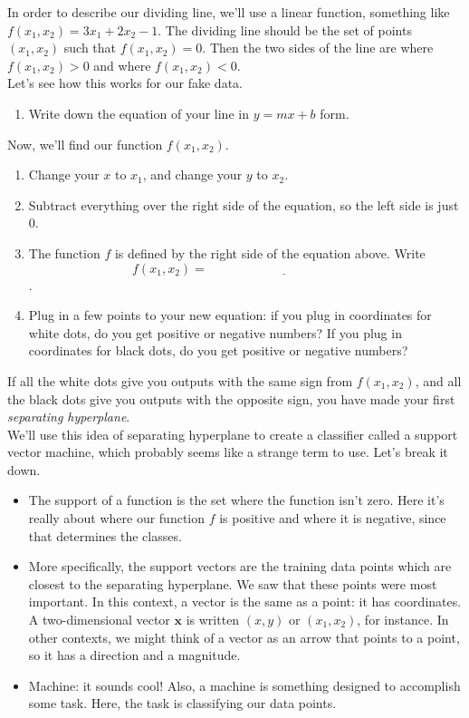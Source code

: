 \documentclass[10pt]{article}
\renewcommand{\vec}[1]{\mathbf{#1}}
\begin{document}
\newpage

In order to describe our dividing line, we'll use a linear function, something like $f(x_1,x_2) = 3x_1+2x_2-1$. The dividing line should be the set of points $(x_1,x_2)$ such that $f(x_1,x_2)=0$. Then the two sides of the line are where $f(x_1,x_2) >0$ and where $f(x_1,x_2) < 0$.\\

Let's see how this works for our fake data.

\begin{enumerate}[resume]
\item Write down the equation of your line in $y=mx+b$ form.
\vfill
\end{enumerate}

Now, we'll find our function $f(x_1,x_2)$.

\begin{enumerate}[resume]
\item Change your $x$ to $x_1$, and change your $y$ to $x_2$.
\vfill
\item Subtract everything over the right side of the equation, so the left side is just $0$.
\vfill
\item The function $f$ is defined by the right side of the equation above. Write 
\[f(x_1,x_2 ) = \underline{\hspace{2in}}\].
\item Plug in a few points to your new equation: if you plug in coordinates for white dots, do you get positive or negative numbers? If you plug in coordinates for black dots, do you get positive or negative numbers?
\vfill
\end{enumerate}

If all the white dots give you outputs with the same sign from $f(x_1,x_2)$, and all the black dots give you outputs with the opposite sign, you have made your first \textit{separating hyperplane}.\\

We'll use this idea of separating hyperplane to create a classifier called a support vector machine, which probably seems like a strange term to use. Let's break it down. 
\begin{itemize}
\item The support of a function is the set where the function isn't zero. Here it's really about where our function $f$ is positive and where it is negative, since that determines the classes.
\item More specifically, the support vectors are the training data points which are closest to the separating hyperplane. We saw that these points were most important. In this context, a vector is the same as a point: it has coordinates. A two-dimensional vector $\vec{x}$ is written $(x,y)$ or $(x_1, x_2)$, for instance. In other contexts, we might think of a vector as an arrow that points to a point, so it has a direction and a magnitude.
\item Machine: it sounds cool! Also, a machine is something designed to accomplish some task. Here, the task is classifying our data points.
\end{itemize}
\end{document}
